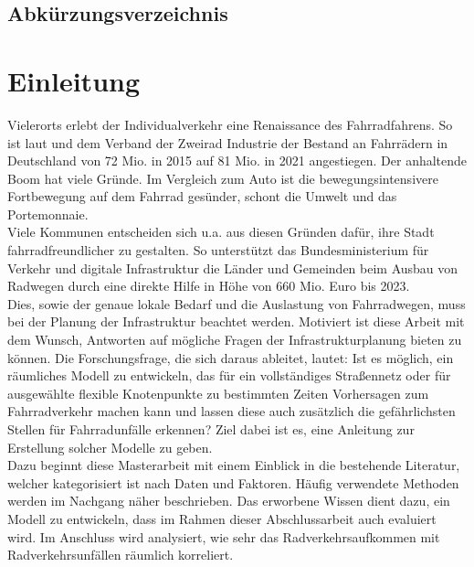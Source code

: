 \documentclass[a4paper,12pt]{thesis}
\begin{document}
\begingroup
\let\clearpage\relax
\listoffigures
\listoftables
\endgroup

\section{Abkürzungsverzeichnis}

\begin{acronym}
\end{acronym}


\chapter{Einleitung}

Vielerorts erlebt der Individualverkehr eine Renaissance des Fahrradfahrens. So ist laut \cite{Eisenberger2015} und dem Verband der Zweirad Industrie \cite{ZIV2022} der Bestand an Fahrrädern in Deutschland von 72 Mio. in 2015 auf 81 Mio. in 2021 angestiegen. Der anhaltende Boom hat viele Gründe. Im Vergleich zum Auto ist die bewegungsintensivere Fortbewegung auf dem Fahrrad gesünder, schont die Umwelt und das Portemonnaie.\\
Viele Kommunen entscheiden sich u.a. aus diesen Gründen dafür, ihre Stadt fahrradfreundlicher zu gestalten. So unterstützt das Bundesministerium für Verkehr und digitale Infrastruktur \cite{VerkehrunddigitaleInfrastruktur2020} die Länder und Gemeinden beim Ausbau von Radwegen durch eine direkte Hilfe in Höhe von 660 Mio. Euro bis 2023.\\
Dies, sowie der genaue lokale Bedarf und die Auslastung von Fahrradwegen, muss bei der Planung der Infrastruktur beachtet werden. Motiviert ist diese Arbeit mit dem Wunsch, Antworten auf mögliche Fragen der Infrastrukturplanung bieten zu können. Die Forschungsfrage, die sich daraus ableitet, lautet: Ist es möglich, ein räumliches Modell zu entwickeln, das für ein vollständiges Straßennetz oder für ausgewählte flexible Knotenpunkte zu bestimmten Zeiten Vorhersagen zum Fahrradverkehr machen kann und lassen diese auch zusätzlich die gefährlichsten Stellen für Fahrradunfälle erkennen? Ziel dabei ist es, eine Anleitung zur Erstellung solcher Modelle zu geben.\\
Dazu beginnt diese Masterarbeit mit einem Einblick in die bestehende Literatur, welcher kategorisiert ist nach Daten und Faktoren. Häufig verwendete Methoden werden im Nachgang näher beschrieben. Das erworbene Wissen dient dazu, ein Modell zu entwickeln, dass im Rahmen dieser Abschlussarbeit auch evaluiert wird. Im Anschluss wird analysiert, wie sehr das Radverkehrsaufkommen mit Radverkehrsunfällen räumlich korreliert.
\end{document}
